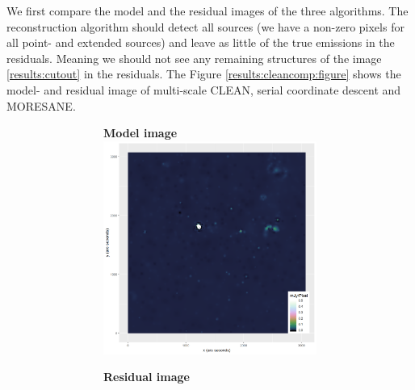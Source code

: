 We first compare the model and the residual images of the three algorithms. The reconstruction algorithm should detect all sources (we have a non-zero pixels for all point- and extended sources) and leave as little of the true emissions in the residuals. Meaning we should not see any remaining structures of the image \ref{results:cutout} in the residuals. The Figure \ref{results:cleancomp:figure} shows the model- and residual image of multi-scale CLEAN, serial coordinate descent and MORESANE.


\newpage

\begin{figure}[!htp]
	\centering
	\begin{subfigure}[b]{0.82\linewidth}
		\centering
		\begin{subfigure}{0.49\linewidth}
			\centering
			\textbf{Model image}
			\includegraphics[width=1.0\linewidth]{./chapters/10.results/MSClean/Natural-CLEAN.png}
		\end{subfigure}
		\begin{subfigure}{0.49\linewidth}
			\centering
			\textbf{Residual image}

\end{subfigure}
\end{subfigure}
\end{figure}
